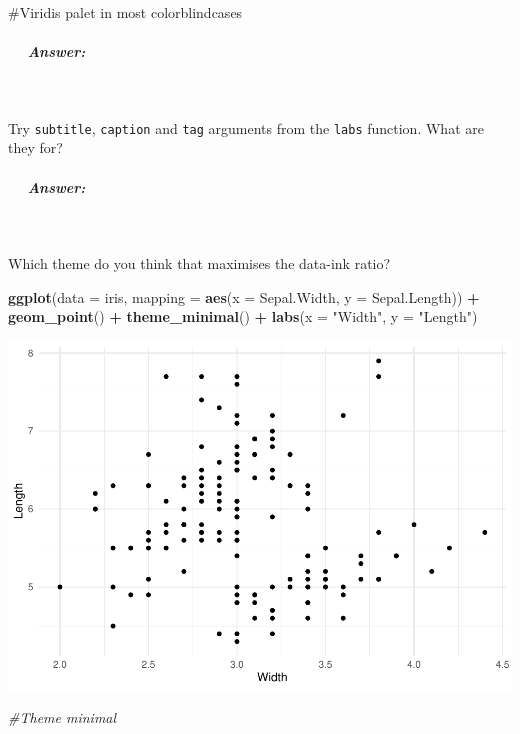 \documentclass[
]{article}
\newenvironment{Shaded}{\begin{snugshade}}{\end{snugshade}}
\newcommand{\AttributeTok}[1]{\textcolor[rgb]{0.13,0.29,0.53}{#1}}
\newcommand{\CommentTok}[1]{\textcolor[rgb]{0.56,0.35,0.01}{\textit{#1}}}
\newcommand{\FunctionTok}[1]{\textcolor[rgb]{0.13,0.29,0.53}{\textbf{#1}}}
\newcommand{\NormalTok}[1]{#1}
\newcommand{\SpecialCharTok}[1]{\textcolor[rgb]{0.81,0.36,0.00}{\textbf{#1}}}
\newcommand{\StringTok}[1]{\textcolor[rgb]{0.31,0.60,0.02}{#1}}
\begin{document}
\#Viridis palet in most colorblindcases

\subparagraph{  Answer:}\label{answer-6}

 

Try \texttt{subtitle}, \texttt{caption} and \texttt{tag} arguments from
the \texttt{labs} function. What are they for?

\subparagraph{  Answer:}\label{answer-7}

 

Which theme do you think that maximises the data-ink ratio?

\begin{Shaded}
\begin{Highlighting}[]
\FunctionTok{ggplot}\NormalTok{(}\AttributeTok{data =}\NormalTok{ iris, }\AttributeTok{mapping =} \FunctionTok{aes}\NormalTok{(}\AttributeTok{x =}\NormalTok{ Sepal.Width, }\AttributeTok{y =}\NormalTok{ Sepal.Length)) }\SpecialCharTok{+}
  \FunctionTok{geom\_point}\NormalTok{() }\SpecialCharTok{+}
  \FunctionTok{theme\_minimal}\NormalTok{() }\SpecialCharTok{+}
  \FunctionTok{labs}\NormalTok{(}\AttributeTok{x =} \StringTok{"Width"}\NormalTok{, }\AttributeTok{y =} \StringTok{"Length"}\NormalTok{)}
\end{Highlighting}
\end{Shaded}

\begin{center}\includegraphics{P1_exercises_files/figure-latex/answer 4.1-1} \end{center}

\begin{Shaded}
\begin{Highlighting}[]
\CommentTok{\#Theme minimal}
\end{Highlighting}
\end{Shaded}
\end{document}
